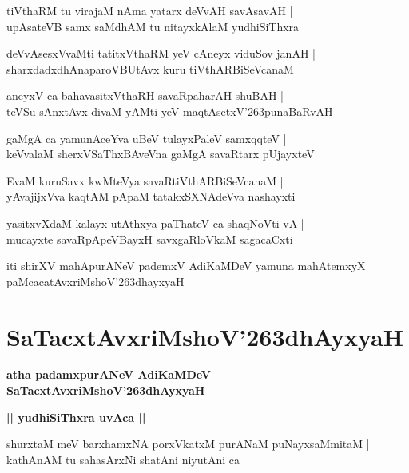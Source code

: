 \documentclass[twoside,12pt,openright]{book}
\def\S{\char'263}
\newcounter{shloka}[chapter]
\def\uvaca#1{\centerline{{\large\textbf{#1}}}}
\begin{document}
\begin{shloka}
tiVthaRM tu virajaM nAma yatarx deVvAH savAsavAH |\\
upAsateVB samx saMdhAM tu nitayxkAlaM yudhiSiThxra
\end{shloka}

\begin{shloka}
deVvAsesxVvaMti tatitxVthaRM  yeV cAneyx viduSov janAH |\\
sharxdadxdhAnaparoVBUtAvx kuru tiVthARBiSeVcanaM 
\end{shloka}
\begin{shloka}
aneyxV ca bahavasitxVthaRH savaRpaharAH shuBAH |\\
teVSu sAnxtAvx divaM yAMti yeV maqtAsetxV\S punaBaRvAH 
\end{shloka}

\begin{shloka}
gaMgA ca yamunAceYva uBeV tulayxPaleV samxqqteV |\\
keVvalaM sherxVSaThxBAveVna gaMgA savaRtarx pUjayxteV 
\end{shloka}

\begin{shloka}
EvaM kuruSavx kwMteVya savaRtiVthARBiSeVcanaM |\\
yAvajijxVva kaqtAM pApaM tatakxSXNAdeVva nashayxti 
\end{shloka}

\begin{shloka}
yasitxvXdaM kalayx utAthxya paThateV ca shaqNoVti vA |\\
mucayxte savaRpApeVBayxH savxgaRloVkaM sagacaCxti 
\end{shloka}

\begin{center}
iti shirXV mahApurANeV pademxV AdiKaMDeV yamuna mahAtemxyX paMcacatAvxriMshoV\S dhayxyaH 
\end{center}

\chapter{SaTacxtAvxriMshoV\S dhAyxyaH}

\begin{center}
{\LARGE\bfseries atha padamxpurANeV AdiKaMDeV SaTacxtAvxriMshoV\S dhAyxyaH}
\end{center}

\uvaca{|| yudhiSiThxra uvAca ||}

\begin{shloka}
shurxtaM meV barxhamxNA porxVkatxM purANaM puNayxsaMmitaM |\\
kathAnAM tu sahasArxNi shatAni niyutAni ca 
\end{shloka}
\end{document}
